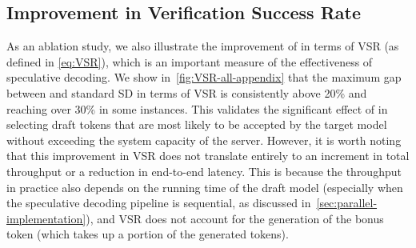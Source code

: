 \begin{table}[!ht]
\centering
\caption{Mean total throughput ($\pm$ standard deviation) for the ablation study of \alg{} extension to Medusa over three independent trials. The integration of \alg{} with Medusa further improves the total throughput.}
\label{tab:ablation-medusa}
\end{table}


\subsection{Improvement in Verification Success Rate}\label{app:improve-VSR}

As an ablation study, we also illustrate the improvement of \alg{} in terms of VSR (as defined in \cref{eq:VSR}), which is an important measure of the effectiveness of speculative decoding.
We show in~\cref{fig:VSR-all-appendix} that the maximum gap between \alg{} and standard SD in terms of VSR is consistently above 20\% and reaching over 30\% in some instances.
This validates the significant effect of \alg{} in selecting draft tokens that are most likely to be accepted by the target model without exceeding the system capacity of the server.
However, it is worth noting that this improvement in VSR does not translate entirely to an increment in total throughput or a reduction in end-to-end latency.
This is because the throughput in practice also depends on the running time of the draft model (especially when the speculative decoding pipeline is sequential, as discussed in~\cref{sec:parallel-implementation}), and VSR does not account for the generation of the bonus token (which takes up a portion of the generated tokens).


